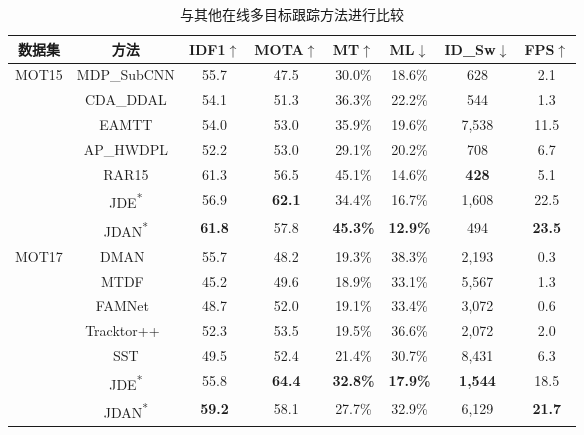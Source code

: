 \vspace{0.5em}
\renewcommand\arraystretch{1.5}
\begin{table}[htbp]\wuhao
	\centering
	\caption{与其他在线多目标跟踪方法进行比较}
	\vspace{0.3em}
	\begin{tabular}{c|c|cccccc}
		\hline
		数据集 & 方法 & IDF1$\uparrow$ & MOTA$\uparrow$ & MT$\uparrow$ & ML$\downarrow$ & ID\_Sw$\downarrow$ & FPS$\uparrow$\\
		\hline
		MOT15 
		& MDP\_SubCNN\cite{xiang2015learning} & 55.7 & 47.5 & 30.0\% & 18.6\% & 628 & 2.1\\
		& CDA\_DDAL\cite{bae2017confidence} & 54.1 & 51.3 & 36.3\% & 22.2\% & 544 & 1.3\\
		& EAMTT\cite{sanchez2016online} & 54.0 & 53.0 & 35.9\% & 19.6\% & 7,538 & 11.5\\ 
		& AP\_HWDPL\cite{chen2017online} & 52.2 & 53.0 & 29.1\% & 20.2\% & 708 & 6.7\\
		& RAR15\cite{fang2018recurrent} & 61.3 & 56.5 & 45.1\% & 14.6\% & {\bf 428} & 5.1\\
		& {JDE\cite{jde}\textsuperscript{*}} & {56.9} & {{\bf 62.1}} & {34.4\%} & {16.7\%} & {1,608} & {22.5}\\
		& JDAN\textsuperscript{*} & {\bf 61.8} & 57.8 & {\bf 45.3\%} & {\bf 12.9\%} & 494 & {\bf 23.5}\\
		\hline
		MOT17 
		& DMAN~\cite{dual_matching} & 55.7 & 48.2 & 19.3\% & 38.3\% & 2,193 & 0.3\\
		& MTDF~\cite{gm_phd} & 45.2 & 49.6 & 18.9\% & 33.1\% & 5,567 & 1.3\\
		& FAMNet~\cite{famnet} & 48.7 & 52.0 & 19.1\% & 33.4\% & 3,072 & 0.6\\
		& Tracktor++~\cite{tracktor} & 52.3 & 53.5 & 19.5\% & 36.6\% & 2,072 & 2.0\\
		& SST\cite{dan} & 49.5 & 52.4 & 21.4\% & 30.7\% & 8,431 & 6.3\\
		& {JDE\cite{jde}\textsuperscript{*}} & {55.8} & {{\bf 64.4}} & {{\bf 32.8\%}} & {{\bf 17.9\%}} & {{\bf 1,544}} & {18.5}\\
		& JDAN\textsuperscript{*} & {\bf 59.2} & 58.1 & 27.7\% & 32.9\% & {6,129} & {\bf 21.7}\\
		\hline
	\end{tabular}
	\label{tab:jdan_sota}
\end{table}


